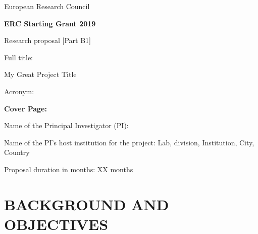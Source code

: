 


\pagestyle{B1}

\noindent European Research Council


\vspace{0.55in}

\begin{center}

{\bf ERC Starting Grant 2019

Research proposal [Part B1]\\}

\vspace{0.55in}

{\LARGE Full title:}

\vspace{0.4in}
 {\LARGE My Great Project Title}

\vspace{0.4in}

{\LARGE Acronym: \ACRONYM}

\end{center}

\vspace{0.4in}
{\bf Cover Page:}

Name of the Principal Investigator (PI):  \PIName

Name of the PI's host institution for the project: Lab, division, Institution, City, Country

Proposal duration in months:  XX months
\vspace{0.4in}

\begin{mdframed}
\lipsum[1]
\end{mdframed}


\clearpage
{}
\label{sec:a}
\section{BACKGROUND AND OBJECTIVES}
\lipsum[2]








\begin{mdframed}[backgroundcolor=bgc]
\lipsum[1]
\end{mdframed}


